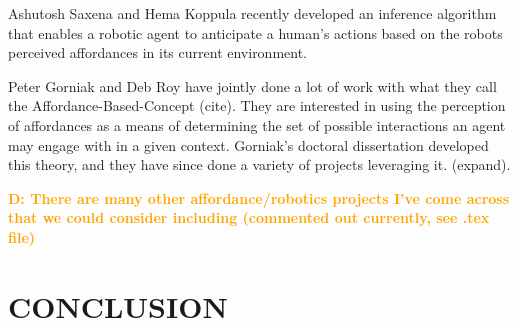\documentclass[]{article}
\newcommand{\dnote}[1]{\textcolor{Orange}{\textbf{D: #1}}}
\begin{document}
Ashutosh Saxena and Hema Koppula recently developed an inference algorithm that enables a robotic agent to anticipate a human's actions based on the robots perceived affordances in its current environment. 

Peter Gorniak and Deb Roy have jointly done a lot of work with what they call the Affordance-Based-Concept (cite). They are interested
in using the perception of affordances as a means of determining the set of possible interactions an agent may engage with in a given context.
Gorniak's doctoral dissertation developed this theory, and they have since done a variety of projects leveraging it. (expand).

\dnote{There are many other affordance/robotics projects I've come across that we could consider including (commented out currently, see .tex file)}


\section{CONCLUSION}
\end{document}
